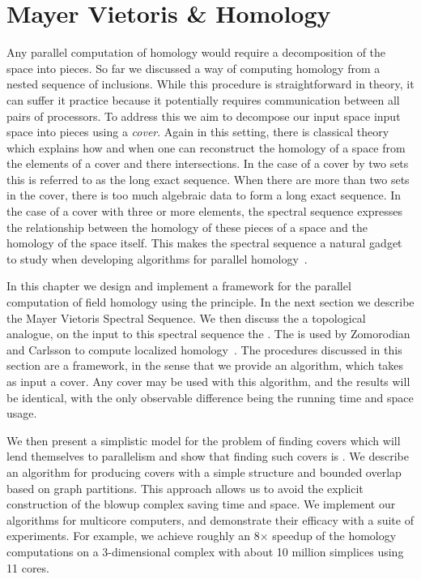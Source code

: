 \chapter{Mayer Vietoris \& Homology}
Any parallel computation of homology would require a decomposition of the
space into pieces. So far we discussed a way of computing homology from a 
nested sequence of inclusions. While this procedure is straightforward in theory, it can suffer it practice
because it potentially requires communication between all pairs of processors. To address this
we aim to decompose our input space input space into pieces using a \emph{cover}. Again in this setting, 
there is classical theory which explains how and when one can reconstruct the homology of a space
from the elements of a cover and there intersections. In the case of a cover by two sets this is referred to as
the \mv long exact sequence. When there are more than two sets in the cover, 
there is too much algebraic data to form a long exact sequence. 
In the case of a cover with three or more elements, the \mv spectral sequence expresses 
the relationship between the homology of these pieces of a space and the homology of the space itself.
This makes the \mv spectral sequence a natural gadget to study when developing algorithms for parallel homology~\cite{hatcher}. 

In this chapter we design and implement a framework for the parallel computation of field homology using the \mv principle. In the next section we describe the Mayer Vietoris Spectral Sequence. We then discuss the a topological analogue, on the input to this spectral sequence the \mvb{}.  
The \mvb{} is used by Zomorodian and Carlsson to compute localized homology~\cite{zc-lh-08}.  The procedures discussed in this section 
are a framework, in the sense that we provide an algorithm, which takes as input a cover. Any cover may be used with this algorithm,
and the results will be identical, with the only observable difference being the running time and space usage. 

We then present a simplistic model for the problem of finding covers which will lend themselves to parallelism and show that finding such covers is \NPH{}.
We describe an algorithm for producing covers with a simple structure and bounded overlap based on graph partitions. This approach allows
us to avoid the explicit construction of the blowup complex saving time and space. We implement our algorithms for multicore computers, 
and demonstrate their efficacy with a suite of experiments.  For example, we achieve roughly an 8$\times$ 
speedup of the homology computations on a 3-dimensional complex with about 10 million simplices using 11 cores.


